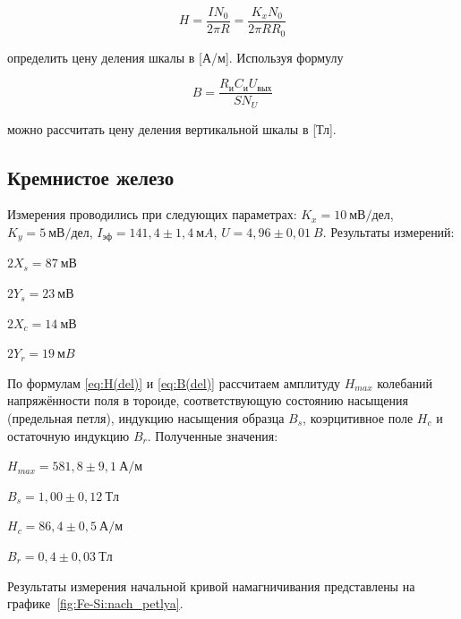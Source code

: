 \documentclass[a4paper, 12pt]{article}
\begin{document}
\begin{equation}\label{eq:H(del)}
H = \frac{I N_0}{2 \pi R} = \frac{K_x N_0}{2 \pi R R_0}
\end{equation}

определить цену деления шкалы в [А/м]. Используя формулу

\begin{equation}\label{eq:B(del)}
B = \frac{R_и C_и U_{вых}}{S N_U}
\end{equation}

можно рассчитать цену деления вертикальной шкалы в [Тл].

\newpage

\subsection{Кремнистое железо}

Измерения проводились при следующих параметрах: $K_x = 10~мВ/дел$, $K_y = 5~мВ/дел$, $I_{эф} = 141,4\pm1,4~мA$, $U = 4,96\pm0,01~B$. Результаты измерений:
\begin{description}
\item{} $2X_s = 87~мВ$
\item{} $2Y_s = 23~мВ$
\item{} $2X_c = 14~мВ$
\item{} $2Y_r = 19~мB$
\end{description}

По формулам \eqref{eq:H(del)} и \eqref{eq:B(del)} рассчитаем амплитуду $H_{max}$ колебаний напряжённости поля в тороиде, соответствующую состоянию насыщения (предельная петля), индукцию насыщения образца $B_s$, коэрцитивное поле $H_c$ и остаточную индукцию $B_r$. Полученные значения:

\begin{description}
\item{} $H_{max} = 581,8\pm9,1~А/м$
\item{} $B_s = 1,00\pm0,12~Тл$
\item{} $H_c = 86,4\pm0,5~А/м$
\item{} $B_r = 0,4\pm0,03~Тл$
\end{description}

Результаты измерения начальной кривой намагничивания представлены на графике~\ref{fig:Fe-Si:nach_petlya}.
\end{document}
